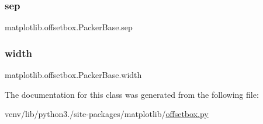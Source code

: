 \subsubsection{\texorpdfstring{sep}{sep}}
{\footnotesize\ttfamily matplotlib.\+offsetbox.\+Packer\+Base.\+sep}

\mbox{\label{classmatplotlib_1_1offsetbox_1_1PackerBase_aadd03b7d76a7b37fedf4de2019899dd0}} 
\subsubsection{\texorpdfstring{width}{width}}
{\footnotesize\ttfamily matplotlib.\+offsetbox.\+Packer\+Base.\+width}



The documentation for this class was generated from the following file\+:\begin{DoxyCompactItemize}
\item 
venv/lib/python3./site-\/packages/matplotlib/\hyperlink{offsetbox_8py}{offsetbox.\+py}\end{DoxyCompactItemize}
